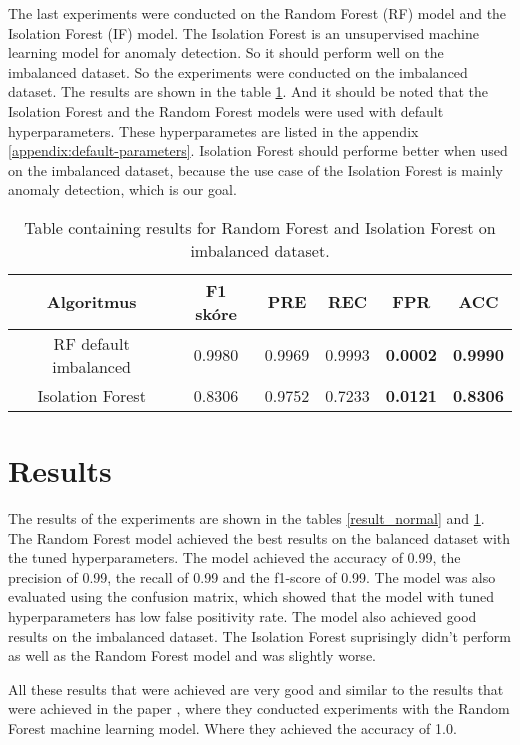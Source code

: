 The last experiments were conducted on the Random Forest (RF) model and the Isolation Forest (IF) model. The Isolation Forest is an unsupervised machine learning model for anomaly detection.
So it should perform well on the imbalanced dataset. So the experiments were conducted on the imbalanced dataset. The results are shown in the table \ref{result_compare}. And it should be noted that the Isolation Forest and the Random Forest models were used with default hyperparameters.
These hyperparametes are listed in the appendix \ref{appendix:default-parameters}. Isolation Forest should performe better when used on the imbalanced dataset, because the use case of the Isolation Forest is mainly anomaly detection, which is our goal.

\begin{table}[h]
    \centering
    \label{result_compare}
    \begin{tabular}{|c|c|c|c|c|c|}
    \hline
    \textbf{Algoritmus} & \textbf{F1 skóre} & \textbf{PRE} & \textbf{REC} & \textbf{FPR} & \textbf{ACC} \\ \hline
    RF default imbalanced     & 0.9980 & 0.9969 & 0.9993 & \textbf{0.0002} & \textbf{0.9990}\\ \hline
    Isolation Forest          & 0.8306 & 0.9752 & 0.7233 & \textbf{0.0121} & \textbf{0.8306}\\ \hline
    \end{tabular}
    \caption{Table containing results for Random Forest and Isolation Forest on imbalanced dataset.}    
\end{table}

\section{Results}

The results of the experiments are shown in the tables \ref{result_normal} and \ref{result_compare}. The Random Forest model achieved the best results on the balanced dataset with the tuned hyperparameters.
The model achieved the accuracy of 0.99, the precision of 0.99, the recall of 0.99 and the f1-score of 0.99. The model was also evaluated using the confusion matrix, which showed 
that the model with tuned hyperparameters has low false positivity rate. The model also achieved good results on the imbalanced dataset. 
The Isolation Forest suprisingly didn't perform as well as the Random Forest model and was slightly worse. 

All these results that were achieved are very good and similar to the results that were achieved in the paper \cite{goat}, where they conducted experiments with the Random Forest machine learning model.
Where they achieved the accuracy of 1.0.


